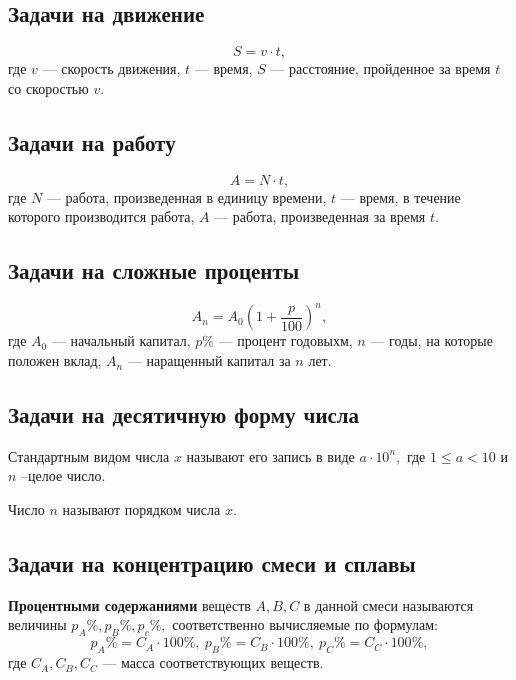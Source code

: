 \documentclass[a5paper, 8pt]{extarticle}
\begin{document}
\subsection{Задачи на движение}
$$S=v\cdot t,$$
где $v$ --- скорость движения, $t$ --- время, $S$ --- расстояние, пройденное за время $t$ со скоростью $v.$
\subsection{Задачи на работу}
$$A=N\cdot t,$$
где $N$ --- работа, произведенная в единицу времени, $t$ --- время, в течение которого производится работа, $A$ --- работа, произведенная за время $t.$
\subsection{Задачи на сложные проценты}
$$A_n=A_0\left( 1+\frac{p}{100}\right)^n ,$$
где $A_0$ --- начальный капитал, $p\%$ --- процент годовыхм, $n$ --- годы, на которые положен вклад, $A_n$ --- наращенный капитал за $n$ лет. 
\subsection{Задачи на десятичную форму числа}
Стандартным видом числа $x$ называют его запись в виде $a\cdot 10^n,$ где $1\le a < 10$ и $n$ --целое число.

Число $n$ называют порядком числа $x.$ 

\subsection{Задачи на концентрацию смеси и сплавы}
\textbf{Процентными содержаниями} веществ $A, B, C$ в данной смеси называются величины $p_A\%, p_B\%, p_c\%,$ соответственно вычисляемые по формулам:
$$
p_A\%=C_A\cdot 100\%,\  p_B\%=C_B\cdot 100\%,\ p_C\%=C_C\cdot 100\%,
$$
где $C_A, C_B, C_C$ --- масса соответствующих веществ.
\end{document}
